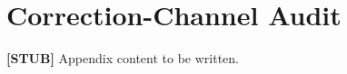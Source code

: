 \chapter{Correction-Channel Audit}
\label{appd-correction-channel-audit}

\textbf{[STUB]} Appendix content to be written.
